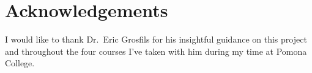 \chapter{Acknowledgements}
I would like to thank Dr.\ Eric Grosfils for his insightful guidance on this project and throughout the four courses I've taken with him during my time at Pomona College.